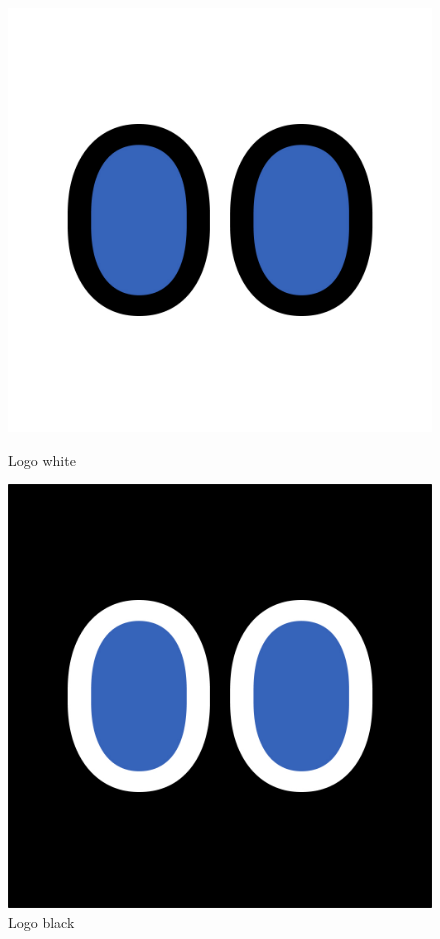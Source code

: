 \begin{figure}[H]
    \begin{minipage}{0.5\textwidth}
        \centering
        \includegraphics[height=0.6\textwidth]{./pics/Relaxoon Logo White.jpg}
        \caption{Logo white}
    \end{minipage}
    \begin{minipage}{0.5\textwidth}
        \centering
        \includegraphics[height=0.6\textwidth]{./pics/Relaxoon Logo Black.jpg}
        \caption{Logo black}
    \end{minipage}
\end{figure}
